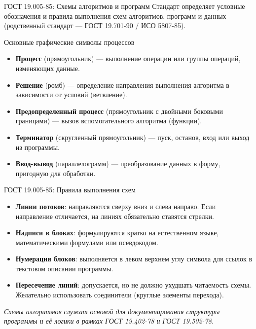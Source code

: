\documentclass[utf8,russian]{beamer}
\begin{document}
\begin{frame}{ГОСТ 19.005-85: Схемы алгоритмов и программ}
  Стандарт определяет условные обозначения и правила выполнения схем алгоритмов, программ и данных (родственный стандарт — ГОСТ 19.701-90 / ИСО 5807-85).
  \vfill
  \begin{block}{Основные графические символы процессов}
    \begin{itemize}
      \item \textbf{Процесс} (прямоугольник) — выполнение операции или группы операций, изменяющих данные.
      \item \textbf{Решение} (ромб) — определение направления выполнения алгоритма в зависимости от условий (ветвление).
      \item \textbf{Предопределенный процесс} (прямоугольник с двойными боковыми границами) — вызов вспомогательного алгоритма (функции).
      \item \textbf{Терминатор} (скругленный прямоугольник) — пуск, останов, вход или выход из программы.
      \item \textbf{Ввод-вывод} (параллелограмм) — преобразование данных в форму, пригодную для обработки.
    \end{itemize}
  \end{block}
\end{frame}

\begin{frame}{ГОСТ 19.005-85: Правила выполнения схем}
  \begin{itemize}
    \item \textbf{Линии потоков}: направляются сверху вниз и слева направо. Если направление отличается, на линиях обязательно ставятся стрелки.
    \item \textbf{Надписи в блоках}: формулируются кратко на естественном языке, математическими формулами или псевдокодом.
    \item \textbf{Нумерация блоков}: выполняется в левом верхнем углу символа для ссылок в текстовом описании программы.
    \item \textbf{Пересечение линий}: допускается, но не должно ухудшать читаемость схемы. Желательно использовать соединители (круглые элементы перехода).
  \end{itemize}
  \vfill
  \begin{center}
    \textit{Схемы алгоритмов служат основой для документирования структуры программы и её логики в рамках ГОСТ 19.402-78 и ГОСТ 19.502-78.}
  \end{center}
\end{frame}
\end{document}
